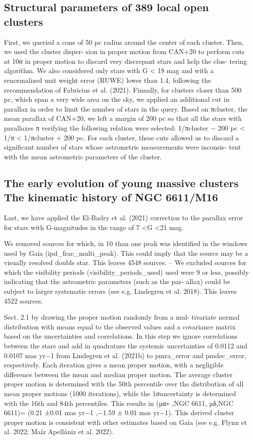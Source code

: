 \documentclass[../main.tex]{subfiles}
\begin{document}
{\subsection{Structural parameters of 389 local open clusters} %
First, we queried a cone of 50 pc radius around the center of each cluster. Then, we used the cluster disper- sion in proper motion from CAN+20 to perform cuts at 10σ in proper motion to discard very discrepant stars and help the clus- tering algorithm. We also considered only stars with G < 18 mag and with a renormalized unit weight error (RUWE) lower than 1.4, following the recommendation of Fabricius et al. (2021). Finnally, for clusters closer than 500 pc, which span a very wide area on the sky, we applied an additional cut in parallax in order to limit the number of stars in the query. Based on πcluster, the mean parallax of CAN+20, we left a margin of 200 pc so that all the stars with parallaxes π verifying the following relation were selected: 1/πcluster − 200 pc < 1/π < 1/πcluster + 200 pc.
For each cluster, these cuts allowed us to discard a significant number of stars whose astrometric measurements were inconsis- tent with the mean astrometric parameters of the cluster.
\subsection{The early evolution of young massive clusters
	The kinematic history of NGC 6611/M16}
Last, we have applied the El-Badry et al. (2021) correction to
the parallax error for stars with G-magnitudes in the range of
7 <G <21 mag.

We removed sources for which, in 10%
than one peak was identified in the windows used by Gaia
(ipd_frac_multi_peak). This could imply that the source
may be a visually resolved double star. This leaves 4548 sources.
– We excluded sources for which the visibility periods
(visibility_periods_used) used were 9 or less, possibly
indicating that the astrometric parameters (such as the par-
allax) could be subject to larger systematic errors (see e.g.
Lindegren et al. 2018). This leaves 4522 sources.

Sect. 2.1 by drawing the proper motion randomly from a mul-
tivariate normal distribution with means equal to the observed
values and a covariance matrix based on the uncertainties and
correlations. In this step we ignore correlations between the stars
and add in quadrature the systemic uncertainties of 0.0112 and
0.0107 mas yr−1 from Lindegren et al. (2021b) to pmra_error
and pmdec_error, respectively. Each iteration gives a mean
proper motion, with a negligible diﬀerence between the mean
and median proper motion. The average cluster proper motion is
determined with the 50th percentile over the distribution of all
mean proper motions (1000 iterations), while the 1σuncertainty
is determined with the 16th and 84th percentiles. This results
in (µα∗
,NGC 6611, µδ,NGC 6611)= (0.21 ±0.01 mas yr−1
,−1.59 ±
0.01 mas yr−1). This derived cluster proper motion is consistent
with other estimates based on Gaia (see e.g. Flynn et al. 2022;
Maíz Apellániz et al. 2022).

}
\end{document}
